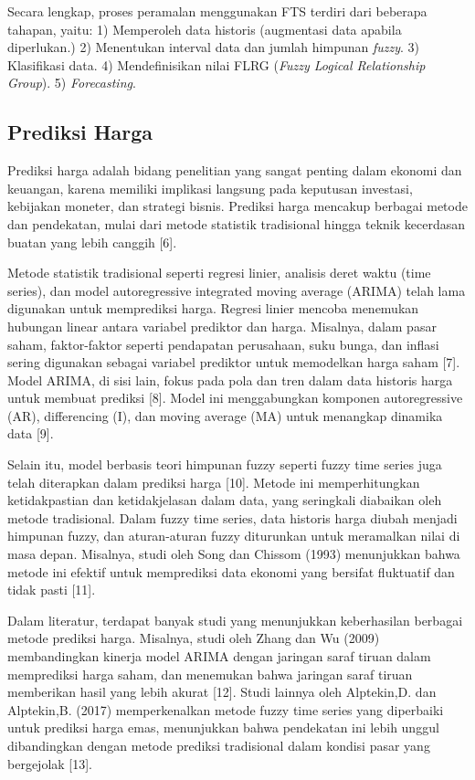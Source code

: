 \documentclass[conference]{IEEEtran}
\begin{document}
Secara lengkap, proses peramalan menggunakan FTS terdiri dari beberapa tahapan, yaitu:
    1) Memperoleh data historis (augmentasi data apabila diperlukan.)
    2) Menentukan interval data dan jumlah himpunan \textit{fuzzy}.
    3) Klasifikasi data.
    4) Mendefinisikan nilai FLRG (\textit{Fuzzy Logical Relationship Group}).
    5) \textit{Forecasting}.
    

\subsection{Prediksi Harga}
Prediksi harga adalah bidang penelitian yang sangat penting dalam ekonomi dan keuangan, karena memiliki implikasi langsung pada keputusan investasi, kebijakan moneter, dan strategi bisnis. Prediksi harga mencakup berbagai metode dan pendekatan, mulai dari metode statistik tradisional hingga teknik kecerdasan buatan yang lebih canggih [6].

Metode statistik tradisional seperti regresi linier, analisis deret waktu (time series), dan model autoregressive integrated moving average (ARIMA) telah lama digunakan untuk memprediksi harga. Regresi linier mencoba menemukan hubungan linear antara variabel prediktor dan harga. Misalnya, dalam pasar saham, faktor-faktor seperti pendapatan perusahaan, suku bunga, dan inflasi sering digunakan sebagai variabel prediktor untuk memodelkan harga saham [7]. Model ARIMA, di sisi lain, fokus pada pola dan tren dalam data historis harga untuk membuat prediksi [8]. Model ini menggabungkan komponen autoregressive (AR), differencing (I), dan moving average (MA) untuk menangkap dinamika data [9].

Selain itu, model berbasis teori himpunan fuzzy seperti fuzzy time series juga telah diterapkan dalam prediksi harga [10]. Metode ini memperhitungkan ketidakpastian dan ketidakjelasan dalam data, yang seringkali diabaikan oleh metode tradisional. Dalam fuzzy time series, data historis harga diubah menjadi himpunan fuzzy, dan aturan-aturan fuzzy diturunkan untuk meramalkan nilai di masa depan. Misalnya, studi oleh Song dan Chissom (1993) menunjukkan bahwa metode ini efektif untuk memprediksi data ekonomi yang bersifat fluktuatif dan tidak pasti [11].

Dalam literatur, terdapat banyak studi yang menunjukkan keberhasilan berbagai metode prediksi harga. Misalnya, studi oleh Zhang dan Wu (2009) membandingkan kinerja model ARIMA dengan jaringan saraf tiruan dalam memprediksi harga saham, dan menemukan bahwa jaringan saraf tiruan memberikan hasil yang lebih akurat [12]. Studi lainnya oleh Alptekin,D. dan Alptekin,B. (2017) memperkenalkan metode fuzzy time series yang diperbaiki untuk prediksi harga emas, menunjukkan bahwa pendekatan ini lebih unggul dibandingkan dengan metode prediksi tradisional dalam kondisi pasar yang bergejolak [13].
\end{document}

